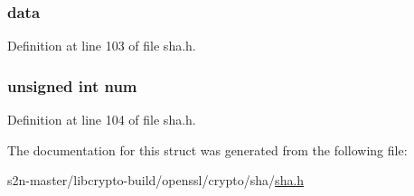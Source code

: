 \subsubsection[{\texorpdfstring{data}{data}}]{ data}\hypertarget{struct_s_h_astate__st_ac27c0f62ef736cf54667d9ae275e3dc1}{}\label{struct_s_h_astate__st_ac27c0f62ef736cf54667d9ae275e3dc1}


Definition at line 103 of file sha.\+h.

\subsubsection[{\texorpdfstring{num}{num}}]{\setlength{\rightskip}{0pt plus 5cm}unsigned int num}\hypertarget{struct_s_h_astate__st_a41ddefd3473727cad32a9767c10faed8}{}\label{struct_s_h_astate__st_a41ddefd3473727cad32a9767c10faed8}


Definition at line 104 of file sha.\+h.



The documentation for this struct was generated from the following file\+:\begin{DoxyCompactItemize}
\item 
s2n-\/master/libcrypto-\/build/openssl/crypto/sha/\hyperlink{crypto_2sha_2sha_8h}{sha.\+h}\end{DoxyCompactItemize}
